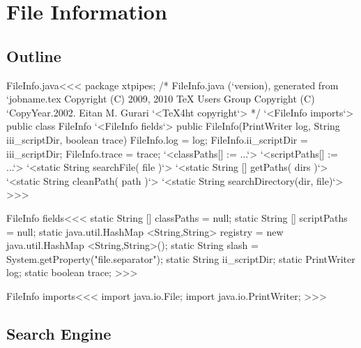\documentclass{article}
\begin{document}
\section{File Information}


\subsection{Outline}




% 


\<FileInfo.java\><<<
package xtpipes;
/* FileInfo.java (`version), generated from `jobname.tex
   Copyright (C) 2009, 2010 TeX Users Group
   Copyright (C) `CopyYear.2002. Eitan M. Gurari
`<TeX4ht copyright`> */
`<FileInfo imports`>
public class FileInfo{
     `<FileInfo fields`>
   public FileInfo(PrintWriter log, String iii_scriptDir, boolean trace) {
      FileInfo.log = log;
      FileInfo.ii_scriptDir = iii_scriptDir;
      FileInfo.trace = trace;
      `<classPaths[] := ...`>
      `<scriptPaths[] := ...`>
   }
   `<static String searchFile( file )`>
   `<static String [] getPaths( dirs )`>
   `<static String cleanPath( path )`>
   `<static String searchDirectory(dir, file)`>
}
>>>

\<FileInfo fields\><<<
static String [] classPaths = null;
static String [] scriptPaths = null;
static java.util.HashMap <String,String> registry =
                                  new java.util.HashMap <String,String>();
static String slash = System.getProperty("file.separator");
static String ii_scriptDir;
static PrintWriter log;
static boolean trace;
>>>


\<FileInfo imports\><<<
import java.io.File;
import java.io.PrintWriter;
>>>

\subsection{Search Engine}
\end{document}
